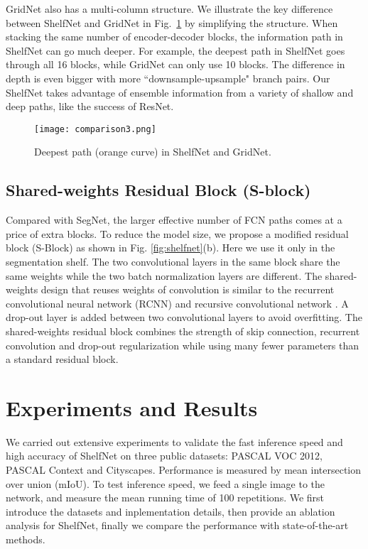 \documentclass[10pt,twocolumn,letterpaper]{article}
\begin{document}
GridNet \cite{fourure2017residual} also has a multi-column structure. We illustrate the key difference between ShelfNet and GridNet in Fig.~\ref{fig:grid} by simplifying the structure. When stacking the same number of encoder-decoder blocks, the information path in ShelfNet can go much deeper. For example, the deepest path in ShelfNet goes through all 16 blocks, while GridNet can only use 10 blocks. The difference in depth is even bigger with more ``downsample-upsample" branch pairs. Our ShelfNet takes advantage of ensemble information from a variety of shallow and deep paths, like the success of ResNet.
\begin{figure}[h]
    \centering
    \texttt{[image: comparison3.png]}
    \caption{\small{Deepest path (orange curve) in ShelfNet and GridNet.}}
    \label{fig:grid}
\end{figure}
\subsection{Shared-weights Residual Block (S-block)}

Compared with SegNet, the larger effective number of FCN paths comes at a price of extra blocks. To reduce the model size, we propose a modified residual block (S-Block) as shown in Fig. \ref{fig:shelfnet}(b). Here we use it only in the segmentation shelf. The two convolutional layers in the same block share the same weights while the two batch normalization layers are different. The shared-weights design that reuses weights of convolution is similar to the recurrent convolutional neural network (RCNN) \cite{alom2017inception} and recursive convolutional network \cite{kim2016deeply}.  A drop-out layer is added between two convolutional layers to avoid overfitting. The shared-weights residual block combines the strength of skip connection, recurrent convolution and drop-out regularization while  using many fewer parameters than a standard residual block.






\section{Experiments and Results}
We carried out extensive experiments to validate the fast inference speed and high accuracy of ShelfNet on three public datasets: PASCAL VOC 2012, PASCAL Context and Cityscapes. Performance is measured by mean intersection over union (mIoU). To test inference speed, we feed a single image to the network, and measure the mean running time of 100 repetitions. We first introduce the datasets and inplementation details, then provide an ablation analysis for ShelfNet, finally we compare the performance with state-of-the-art methods.
\end{document}
